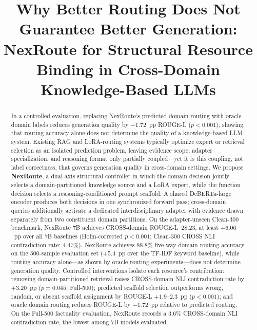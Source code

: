 \documentclass[a4paper,fleql,doubleblind]{cas-sc}
\begin{document}
\let\WriteBookmarks\relax
\def\floatpagepagefraction{0.7}
\def\textpagefraction{0.3}

\shortauthors{}

\title[mode=title]{Why Better Routing Does Not Guarantee Better Generation:
NexRoute for Structural Resource Binding in Cross-Domain Knowledge-Based LLMs}

\author[1]{}



\begin{abstract}
In a controlled evaluation, replacing NexRoute's predicted domain routing with oracle domain labels reduces generation quality by $-1.72$~pp ROUGE-L ($p{<}0.001$), showing that routing accuracy alone does not determine the quality of a knowledge-based LLM system.
Existing RAG and LoRA-routing systems typically optimize expert or retrieval selection as an isolated prediction problem, leaving evidence scope, adapter specialization, and reasoning format only partially coupled---yet it is this coupling, not label correctness, that governs generation quality in cross-domain settings.
We propose \textbf{NexRoute}, a dual-axis structural controller in which the domain decision jointly selects a domain-partitioned knowledge source and a LoRA expert, while the function decision selects a reasoning-conditioned prompt scaffold.
A shared DeBERTa-large encoder produces both decisions in one synchronized forward pass; cross-domain queries additionally activate a dedicated interdisciplinary adapter with evidence drawn separately from two constituent domain partitions.
On the adapter-unseen Clean-300 benchmark, NexRoute 7B achieves CROSS-domain ROUGE-L~28.23, at least $+6.06$~pp over all 7B baselines (Holm-corrected $p{<}0.001$; Clean-300 CROSS NLI contradiction rate: 4.47\%).
NexRoute achieves 88.8\% five-way domain routing accuracy on the 500-sample evaluation set ($+5.4$~pp over the TF-IDF keyword baseline), while routing accuracy alone---as shown by oracle routing experiments---does not determine generation quality.
Controlled interventions isolate each resource's contribution: removing domain-partitioned retrieval raises CROSS-domain NLI contradiction rate by $+3.20$~pp ($p{=}0.045$; Full-500); predicted scaffold selection outperforms wrong, random, or absent scaffold assignment by ROUGE-L $+1.9$--$2.3$~pp ($p{<}0.001$); and oracle domain routing reduces ROUGE-L by $-1.72$~pp relative to predicted routing.
On the Full-500 factuality evaluation, NexRoute records a 3.6\% CROSS-domain NLI contradiction rate, the lowest among 7B models evaluated.

\end{abstract}
\end{document}
